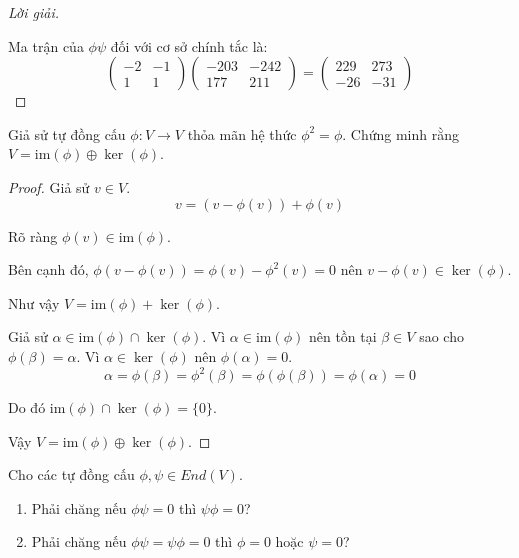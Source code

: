 \documentclass[class=nhvh-linear-algebra,crop=false]{standalone}
\begin{document}
\begin{proof}[Lời giải]
\[    \]
    \par Ma trận của $\phi\psi$ đối với cơ sở chính tắc là:
    \[
        \begin{pmatrix}
            -2 & -1 \\
            1  & 1
        \end{pmatrix}
        \begin{pmatrix}
            -203 & -242 \\
            177  & 211
        \end{pmatrix}=
        \begin{pmatrix}
            229 & 273 \\
            -26 & -31
        \end{pmatrix}
    \]
\end{proof}

\begin{exercise}
    Giả sử tự đồng cấu $\phi: V\to V$ thỏa mãn hệ thức $\phi^{2} = \phi$. Chứng minh rằng $V = \text{im}(\phi)\oplus\ker(\phi)$.
\end{exercise}

\begin{proof}
    Giả sử $v\in V$.
    \[
        v = (v - \phi(v)) + \phi(v)
    \]
    \par Rõ ràng $\phi(v)\in\text{im}(\phi)$.
    \par Bên cạnh đó, $\phi(v - \phi(v)) = \phi(v) - \phi^{2}(v) = 0$ nên $v - \phi(v)\in\ker(\phi)$.
    \par Như vậy $V = \text{im}(\phi)+\ker(\phi)$.
    \bigskip
    \par Giả sử $\alpha\in\text{im}(\phi)\cap\ker(\phi)$. Vì $\alpha\in\text{im}(\phi)$ nên tồn tại $\beta\in V$ sao cho $\phi(\beta) = \alpha$. Vì $\alpha\in\ker(\phi)$ nên $\phi(\alpha) = 0$.
    \[
        \alpha = \phi(\beta) = \phi^{2}(\beta) = \phi(\phi(\beta)) = \phi(\alpha) = 0
    \]
    \par Do đó $\text{im}(\phi)\cap\ker(\phi) = \{ 0 \}$.
    \par Vậy $V = \text{im}(\phi)\oplus\ker(\phi)$.
\end{proof}

\begin{exercise}
    Cho các tự đồng cấu $\phi, \psi\in End(V)$.
    \begin{enumerate}[label = (\alph*)]
        \item Phải chăng nếu $\phi\psi = 0$ thì $\psi\phi = 0$?
        \item Phải chăng nếu $\phi\psi = \psi\phi = 0$ thì $\phi = 0$ hoặc $\psi = 0$?
    \end{enumerate}
\end{exercise}
\end{document}
